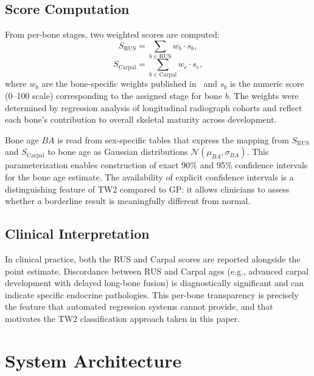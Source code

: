 \documentclass[journal]{IEEEtran}
\begin{document}
\subsection{Score Computation}

From per-bone stages, two weighted scores are computed:
\begin{equation}
  S_{\text{RUS}} = \sum_{b \in \text{RUS}} w_b \cdot s_b,
  \label{eq:rus}
\end{equation}
\begin{equation}
  S_{\text{Carpal}} = \sum_{b \in \text{Carpal}} w_c \cdot s_c,
  \label{eq:carpal}
\end{equation}
where $w_b$ are the bone-specific weights published in~\cite{tanner1983}
and $s_b$ is the numeric score (0--100 scale) corresponding to the
assigned stage for bone $b$.
The weights were determined by regression analysis of longitudinal
radiograph cohorts and reflect each bone's contribution to
overall skeletal maturity across development.

Bone age $BA$ is read from sex-specific tables that express the
mapping from $S_{\text{RUS}}$ and $S_{\text{Carpal}}$ to bone age
as Gaussian distributions $\mathcal{N}(\mu_{BA}, \sigma_{BA})$.
This parameterization enables construction of exact 90\% and
95\% confidence intervals for the bone age estimate.
The availability of explicit confidence intervals is a distinguishing
feature of TW2 compared to GP: it allows clinicians to assess
whether a borderline result is meaningfully different from normal.

\subsection{Clinical Interpretation}

In clinical practice, both the RUS and Carpal scores are reported
alongside the point estimate.
Discordance between RUS and Carpal ages (e.g., advanced carpal
development with delayed long-bone fusion) is diagnostically
significant and can indicate specific endocrine pathologies.
This per-bone transparency is precisely the feature that
automated regression systems cannot provide, and that motivates
the TW2 classification approach taken in this paper.

\section{System Architecture}
\label{sec:system}
\end{document}

